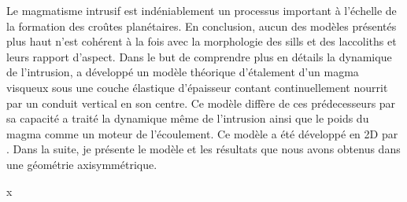 Le  magmatisme intrusif  est indéniablement  un processus  important à
l'échelle  de la  formation des  croûtes planétaires.   En conclusion,
aucun des modèles présentés plus haut n'est cohérent à la fois avec la
morphologie des  sills et  des laccoliths  et leurs  rapport d'aspect.
Dans le but de comprendre plus en détails la dynamique de l'intrusion,
\citet{Michaut:2011kg}  a développé  un  modèle théorique  d'étalement
d'un  magma visqueux  sous  une couche  élastique d'épaisseur  contant
continuellement nourrit  par un  conduit vertical  en son  centre.  Ce
modèle  diffère de  ces  prédecesseurs  par sa  capacité  a traité  la
dynamique même  de l'intrusion ainsi  que le  poids du magma  comme un
moteur  de  l'écoulement.   Ce  modèle  a  été  développé  en  2D  par
\citep{Thorey:2014cv}. Dans  la suite,  je présente  le modèle  et les
résultats que nous avons obtenus dans une géométrie axisymmétrique.

x                                        


